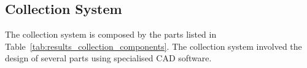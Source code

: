 \subsection{Collection System}%
\label{sub:results_collection}

The collection system is composed by the parts listed in
Table~\ref{tab:results_collection_components}. The collection system
involved the design of several parts using specialised CAD software.

